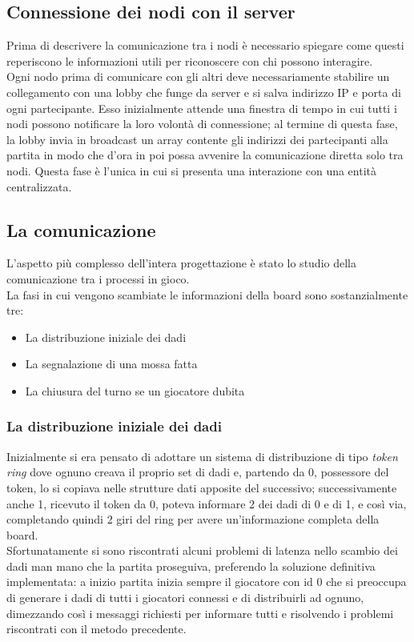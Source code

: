 \documentclass{llncs}
\begin{document}
	\subsection{Connessione dei nodi con il server}
	Prima di descrivere la comunicazione tra i nodi è necessario spiegare come questi reperiscono le informazioni utili per riconoscere con chi possono interagire. \\
	Ogni nodo prima di comunicare con gli altri deve necessariamente stabilire un collegamento con una lobby che funge da server e si salva indirizzo IP e porta di ogni partecipante. Esso inizialmente attende una finestra di tempo in cui tutti i nodi possono notificare la loro volontà di connessione; al termine di questa fase, la lobby invia in broadcast un array contente gli indirizzi dei partecipanti alla partita in modo che d'ora in poi possa avvenire la comunicazione diretta solo tra nodi. Questa fase è l'unica in cui si presenta una interazione con una entità centralizzata. 

	\subsection{La comunicazione}
	L'aspetto più complesso dell'intera progettazione è stato lo studio della comunicazione tra i processi in gioco.\\
	La fasi in cui vengono scambiate le informazioni della board sono sostanzialmente tre:
	\begin{itemize}
		\item La distribuzione iniziale dei dadi
		\item La segnalazione di una mossa fatta
		\item La chiusura del turno se un giocatore dubita
	\end{itemize}
		
	\subsubsection{La distribuzione iniziale dei dadi}
	Inizialmente si era pensato di adottare un sistema di distribuzione di tipo \textit{token ring} dove ognuno creava il proprio set di dadi e, partendo da 0, possessore del token, lo si copiava nelle strutture dati apposite del successivo; successivamente anche 1, ricevuto il token da 0, poteva informare 2 dei dadi di 0 e di 1, e così via, completando quindi 2 giri del ring per avere un'informazione completa della board.\\
	Sfortunatamente si sono riscontrati alcuni problemi di latenza nello scambio dei dadi man mano che la partita proseguiva, preferendo la soluzione definitiva implementata: a inizio partita inizia sempre il giocatore con id 0 che si preoccupa di generare i dadi di tutti i giocatori connessi e di distribuirli ad ognuno, dimezzando così i messaggi richiesti per informare tutti e risolvendo i problemi riscontrati con il metodo precedente.\\
	
\end{document}
